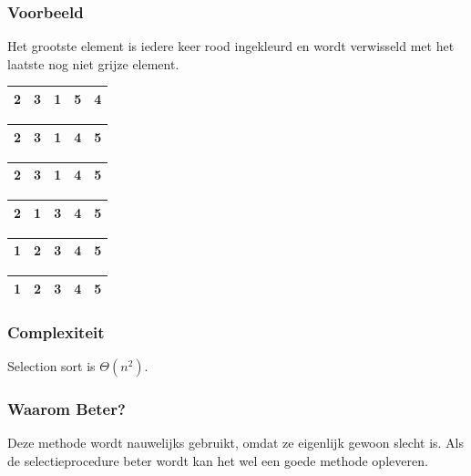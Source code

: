 \documentclass{article}
\begin{document}
\subsubsection{Voorbeeld} %
\label{sub:sel_sort_voorbeeld}
Het grootste element is iedere keer rood ingekleurd en wordt verwisseld met het laatste nog niet grijze element.
\begin{center}
\begin{tabular}{ |c|c|c|c|c| }
\hline
2 & 3 & 1 & \cellcolor{red}5 & 4 \\
\hline
\end{tabular}

\begin{tabular}{ |c|c|c|c|c| }
\hline
2 & 3 & 1 & \cellcolor{red}4 & \cellcolor{gray}5 \\
\hline
\end{tabular}

\begin{tabular}{ |c|c|c|c|c| }
\hline
2 & \cellcolor{red}3 & 1 & \cellcolor{gray}4 & \cellcolor{gray}5 \\
\hline
\end{tabular}

\begin{tabular}{ |c|c|c|c|c| }
\hline
\cellcolor{red}2 & 1 & \cellcolor{gray}3 & \cellcolor{gray}4 & \cellcolor{gray}5 \\
\hline
\end{tabular}

\begin{tabular}{ |c|c|c|c|c| }
\hline
\cellcolor{red}1 & \cellcolor{gray}2 & \cellcolor{gray}3 & \cellcolor{gray}4 & \cellcolor{gray}5 \\
\hline
\end{tabular}

\begin{tabular}{ |c|c|c|c|c| }
\hline
\cellcolor{gray}1 & \cellcolor{gray}2 & \cellcolor{gray}3 & \cellcolor{gray}4 & \cellcolor{gray}5 \\
\hline
\end{tabular}
\end{center}

\subsubsection{Complexiteit} %
\label{sub:sel_sort_complexiteit}
Selection sort is $\Theta(n^2)$.

\subsubsection{Waarom Beter?} %
\label{sub:sel_sort_waarom_beter}
Deze methode wordt nauwelijks gebruikt, omdat ze eigenlijk gewoon slecht is. Als de selectieprocedure beter wordt kan het wel een goede methode opleveren.
\end{document}
